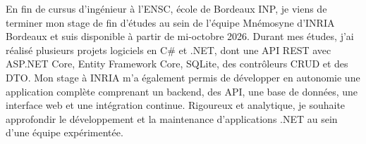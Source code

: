 
\begin{cvparagraph}
En fin de cursus d’ingénieur à l’ENSC, école de Bordeaux INP, je viens de terminer mon stage de fin d’études au sein de l’équipe Mnémosyne d’INRIA Bordeaux et suis disponible à partir de mi-octobre 2026. Durant mes études, j’ai réalisé plusieurs projets logiciels en C\# et .NET, dont une API REST avec ASP.NET Core, Entity Framework Core, SQLite, des contrôleurs CRUD et des DTO. Mon stage à INRIA m’a également permis de développer en autonomie une application complète comprenant un backend, des API, une base de données, une interface web et une intégration continue. Rigoureux et analytique, je souhaite approfondir le développement et la maintenance d’applications .NET au sein d’une équipe expérimentée.
\end{cvparagraph}
